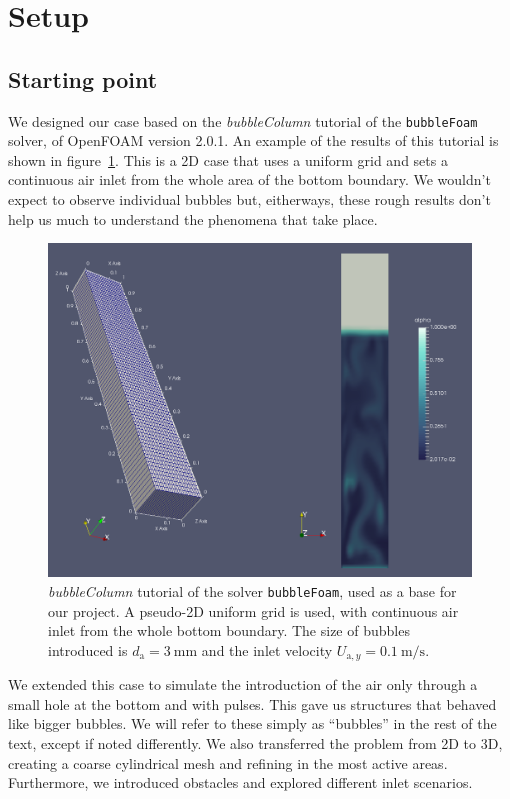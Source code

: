 \documentclass[11pt, a4paper, twoside]{article}
\begin{document}
\section{Setup}

\subsection{Starting point}
We designed our case based on the \emph{bubbleColumn} tutorial of the \texttt{bubbleFoam} solver, of OpenFOAM version 2.0.1. An example of the results of this tutorial is shown in figure~\ref{fig:bubbleColumn_tutorial}. This is a 2D case that uses a uniform grid and sets a continuous air inlet from the whole area of the bottom boundary. We wouldn't expect to observe individual bubbles but, eitherways, these rough results don't help us much to understand the phenomena that take place.

\begin{figure}
    \centering
    \includegraphics[width=\textwidth]{figures/bubbleColumn_tutorial}
    \caption{\emph{bubbleColumn} tutorial of the solver \texttt{bubbleFoam}, used as a base for our project. A pseudo-2D uniform grid is used, with continuous air inlet from the whole bottom boundary. The size of bubbles introduced is $d_\mathrm{a}=\SI{3}{\milli\metre}$ and the inlet velocity $U_{\mathrm{a},y}=\SI{0.1}{\metre/\second}$.}
    \label{fig:bubbleColumn_tutorial}
\end{figure}

We extended this case to simulate the introduction of the air only through a small hole at the bottom and with pulses. This gave us structures that behaved like bigger bubbles. We will refer to these simply as ``bubbles'' in the rest of the text, except if noted differently. We also transferred the problem from 2D to 3D, creating a coarse cylindrical mesh and refining in the most active areas. Furthermore, we introduced obstacles and explored different inlet scenarios.
\end{document}
